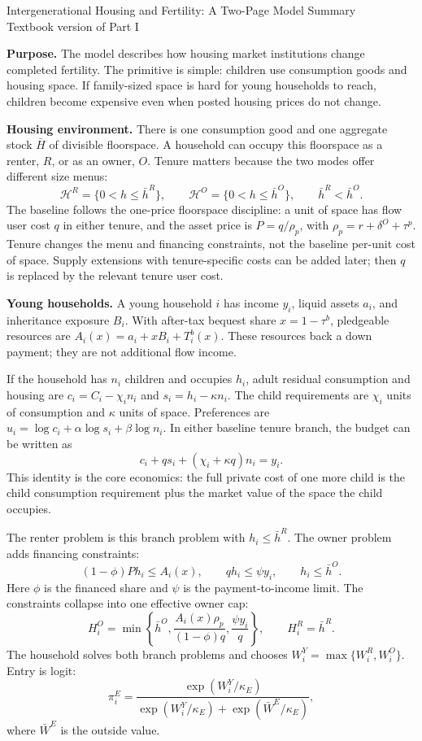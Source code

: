 \documentclass[10pt]{article}
\newcommand{\1}{\mathbf 1}
\newcommand{\HH}{\mathcal H}
\begin{document}
\normalsize

\begin{center}
{\large Intergenerational Housing and Fertility: A Two-Page Model Summary}\\[-0.2em]
{\normalsize Textbook version of Part I}
\end{center}

\textbf{Purpose.}
The model describes how housing market institutions change completed fertility. The primitive is simple: children use consumption goods and housing space. If family-sized space is hard for young households to reach, children become expensive even when posted housing prices do not change.

\textbf{Housing environment.}
There is one consumption good and one aggregate stock \(\bar H\) of divisible floorspace. A household can occupy this floorspace as a renter, \(R\), or as an owner, \(O\). Tenure matters because the two modes offer different size menus:
\[
\HH^R=\{0<h\le\bar h^R\},\qquad
\HH^O=\{0<h\le\bar h^O\},\qquad
\bar h^R<\bar h^O .
\]
The baseline follows the one-price floorspace discipline: a unit of space has flow user cost \(q\) in either tenure, and the asset price is \(P=q/\rho_p\), with \(\rho_p=r+\delta^O+\tau^p\). Tenure changes the menu and financing constraints, not the baseline per-unit cost of space. Supply extensions with tenure-specific costs can be added later; then \(q\) is replaced by the relevant tenure user cost.

\textbf{Young households.}
A young household \(i\) has income \(y_i\), liquid assets \(a_i\), and inheritance exposure \(B_i\). With after-tax bequest share \(x=1-\tau^b\), pledgeable resources are \(A_i(x)=a_i+xB_i+T_i^b(x)\). These resources back a down payment; they are not additional flow income.

If the household has \(n_i\) children and occupies \(h_i\), adult residual consumption and housing are \(c_i=C_i-\chi_i n_i\) and \(s_i=h_i-\kappa n_i\). The child requirements are \(\chi_i\) units of consumption and \(\kappa\) units of space. Preferences are \(u_i=\log c_i+\alpha\log s_i+\beta\log n_i\). In either baseline tenure branch, the budget can be written as
\[
c_i+q s_i+(\chi_i+\kappa q)n_i=y_i .
\]
This identity is the core economics: the full private cost of one more child is the child consumption requirement plus the market value of the space the child occupies.

The renter problem is this branch problem with \(h_i\le \bar h^R\). The owner problem adds financing constraints:
\[
(1-\phi)P h_i\le A_i(x),\qquad q h_i\le \psi y_i,\qquad h_i\le\bar h^O .
\]
Here \(\phi\) is the financed share and \(\psi\) is the payment-to-income limit. The constraints collapse into one effective owner cap:
\[
H_i^O=\min\left\{\bar h^O,\frac{A_i(x)\rho_p}{(1-\phi)q},\frac{\psi y_i}{q}\right\},
\qquad H_i^R=\bar h^R .
\]
The household solves both branch problems and chooses \(W_i^Y=\max\{W_i^R,W_i^O\}\). Entry is logit:
\[
\pi_i^E=\frac{\exp(W_i^Y/\kappa_E)}
{\exp(W_i^Y/\kappa_E)+\exp(\bar W^E/\kappa_E)} ,
\]
where \(\bar W^E\) is the outside value.
\end{document}
